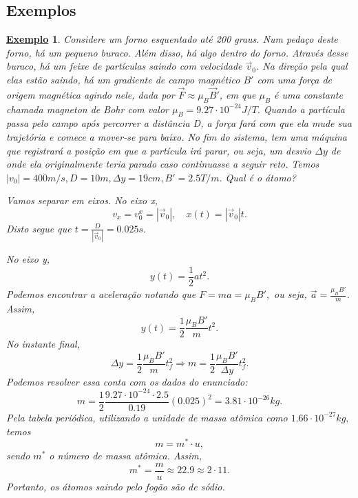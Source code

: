 \documentclass{article}
\newtheorem{example}{\underline{Exemplo}}
\begin{document}
\subsection{Exemplos}
\begin{example}
  Considere um forno esquentado at\'e 200 graus. Num peda\c co deste forno, h\'a um pequeno buraco. Al\'em disso, h\'a algo dentro do forno.
Atrav\'es desse buraco, h\'a um feixe de part\'iculas saindo com velocidade $\vec{v}_{0}$. Na dire\c c\~ao pela qual elas est\~ao saindo,
h\'a um gradiente de campo magn\'etico $B'$ com uma for\c ca de origem magn\'etica agindo nele, dada por $\vec{F}\approx \mu_{B}\vec{B}'$,
em que $\mu_{B}$ \'e uma constante chamada magneton de Bohr com valor $\mu_{B}=9.27 \cdot 10^{-24}J/T.$ Quando a part\'icula passa pelo
campo ap\'os percorrer a dist\^ancia D, a for\c ca far\'a com que ela mude sua trajet\'oria e comece a mover-se para baixo. No fim do sistema, tem uma m\'aquina
que registrar\'a a posi\c c\~ao em que a part\'icula ir\'a parar, ou seja, um desvio $\Delta y$ de onde ela originalmente
teria parado caso continuasse a seguir reto.
Temos $|v_{0}|=400m/s, D = 10m, \Delta y = 19cm, B' = 2.5T/m.$ Qual \'e o \'atomo? 

Vamos separar em eixos. No eixo x, 
  $$
    v_{x} = v_{0}^{x} = |\vec{v}_{0}|,\quad x(t) = |\vec{v}_{0}|t.
  $$
  Disto segue que $t = \frac{D}{|\vec{v}_{0}|} = 0.025s.$

  No eixo y, 
    $$
      y(t) = \frac{1}{2}at^{2}.
    $$
  Podemos encontrar a acelera\c c\~ao notando que $F = ma = \mu_{B}B',$ ou seja, $\vec{a} = \frac{\mu_{B}B'}{m}$. Assim, 
    $$
      y(t) = \frac{1}{2}\frac{\mu_{B}B'}{m}t^{2}.
    $$
  No instante final, 
    $$
      \Delta y=\frac{1}{2}\frac{\mu_{B}B'}{m}t_{f}^{2} \Rightarrow m = \frac{1}{2}\frac{\mu_{B}B'}{\Delta y}t_{f}^{2}.
    $$
  Podemos resolver essa conta com os dados do enunciado: 
    $$
      m = \frac{1}{2}\frac{9.27 \cdot 10^{-24}\cdot 2.5}{0.19}(0.025)^{2} = 3.81 \cdot 10^{-26}kg.
    $$
  Pela tabela peri\'odica, utilizando a unidade de massa at\^omica como $1.66 \cdot 10^{-27}kg,$ temos 
    $$
      m = m^{*}\cdot u,
    $$
  sendo $m^{*}$ o n\'umero de massa at\^omica. Assim, 
    $$
      m^{*} = \frac{m}{u}\approx 22.9\approx 2 \cdot 11.
    $$
  Portanto, os \'atomos saindo pelo fog\~ao s\~ao de s\'odio.
\end{example}
\end{document}
